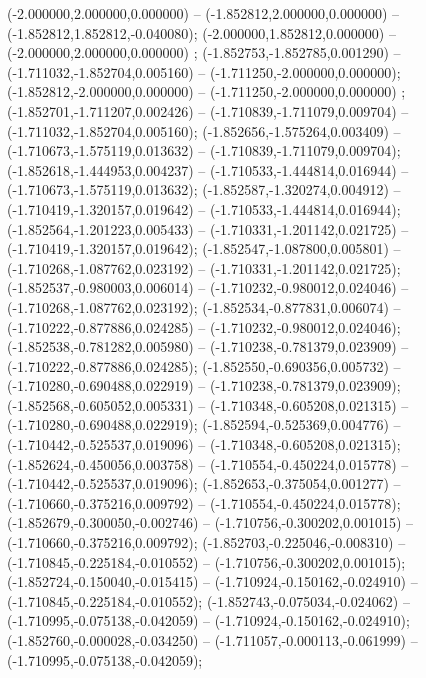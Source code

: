  (-2.000000,2.000000,0.000000) -- (-1.852812,2.000000,0.000000) -- (-1.852812,1.852812,-0.040080);
 (-2.000000,1.852812,0.000000) -- (-2.000000,2.000000,0.000000) ;
 (-1.852753,-1.852785,0.001290) -- (-1.711032,-1.852704,0.005160) -- (-1.711250,-2.000000,0.000000);
 (-1.852812,-2.000000,0.000000) -- (-1.711250,-2.000000,0.000000) ;
 (-1.852701,-1.711207,0.002426) -- (-1.710839,-1.711079,0.009704) -- (-1.711032,-1.852704,0.005160);
 (-1.852656,-1.575264,0.003409) -- (-1.710673,-1.575119,0.013632) -- (-1.710839,-1.711079,0.009704);
 (-1.852618,-1.444953,0.004237) -- (-1.710533,-1.444814,0.016944) -- (-1.710673,-1.575119,0.013632);
 (-1.852587,-1.320274,0.004912) -- (-1.710419,-1.320157,0.019642) -- (-1.710533,-1.444814,0.016944);
 (-1.852564,-1.201223,0.005433) -- (-1.710331,-1.201142,0.021725) -- (-1.710419,-1.320157,0.019642);
 (-1.852547,-1.087800,0.005801) -- (-1.710268,-1.087762,0.023192) -- (-1.710331,-1.201142,0.021725);
 (-1.852537,-0.980003,0.006014) -- (-1.710232,-0.980012,0.024046) -- (-1.710268,-1.087762,0.023192);
 (-1.852534,-0.877831,0.006074) -- (-1.710222,-0.877886,0.024285) -- (-1.710232,-0.980012,0.024046);
 (-1.852538,-0.781282,0.005980) -- (-1.710238,-0.781379,0.023909) -- (-1.710222,-0.877886,0.024285);
 (-1.852550,-0.690356,0.005732) -- (-1.710280,-0.690488,0.022919) -- (-1.710238,-0.781379,0.023909);
 (-1.852568,-0.605052,0.005331) -- (-1.710348,-0.605208,0.021315) -- (-1.710280,-0.690488,0.022919);
 (-1.852594,-0.525369,0.004776) -- (-1.710442,-0.525537,0.019096) -- (-1.710348,-0.605208,0.021315);
 (-1.852624,-0.450056,0.003758) -- (-1.710554,-0.450224,0.015778) -- (-1.710442,-0.525537,0.019096);
 (-1.852653,-0.375054,0.001277) -- (-1.710660,-0.375216,0.009792) -- (-1.710554,-0.450224,0.015778);
 (-1.852679,-0.300050,-0.002746) -- (-1.710756,-0.300202,0.001015) -- (-1.710660,-0.375216,0.009792);
 (-1.852703,-0.225046,-0.008310) -- (-1.710845,-0.225184,-0.010552) -- (-1.710756,-0.300202,0.001015);
 (-1.852724,-0.150040,-0.015415) -- (-1.710924,-0.150162,-0.024910) -- (-1.710845,-0.225184,-0.010552);
 (-1.852743,-0.075034,-0.024062) -- (-1.710995,-0.075138,-0.042059) -- (-1.710924,-0.150162,-0.024910);
 (-1.852760,-0.000028,-0.034250) -- (-1.711057,-0.000113,-0.061999) -- (-1.710995,-0.075138,-0.042059);

